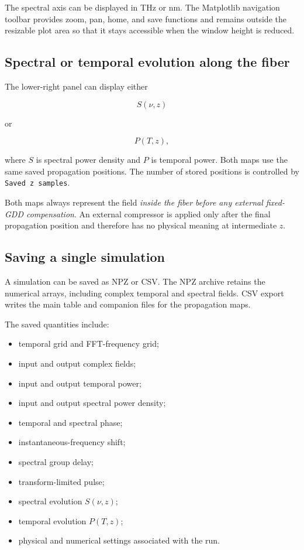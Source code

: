 \documentclass[11pt,a4paper]{article}
\begin{document}
The spectral axis can be displayed in THz or nm. The Matplotlib navigation
toolbar provides zoom, pan, home, and save functions and remains outside the
resizable plot area so that it stays accessible when the window height is
reduced.

\subsection{Spectral or temporal evolution along the fiber}

The lower-right panel can display either

\begin{equation}
S(\nu,z)
\end{equation}

or

\begin{equation}
P(T,z),
\end{equation}

where $S$ is spectral power density and $P$ is temporal power. Both maps use the
same saved propagation positions. The number of stored positions is controlled
by \texttt{Saved z samples}.

Both maps always represent the field \emph{inside the fiber before any external
fixed-GDD compensation}. An external compressor is applied only after the final
propagation position and therefore has no physical meaning at intermediate $z$.

\subsection{Saving a single simulation}

A simulation can be saved as NPZ or CSV. The NPZ archive retains the numerical
arrays, including complex temporal and spectral fields. CSV export writes the
main table and companion files for the propagation maps.

The saved quantities include:

\begin{itemize}
    \item temporal grid and FFT-frequency grid;
    \item input and output complex fields;
    \item input and output temporal power;
    \item input and output spectral power density;
    \item temporal and spectral phase;
    \item instantaneous-frequency shift;
    \item spectral group delay;
    \item transform-limited pulse;
    \item spectral evolution $S(\nu,z)$;
    \item temporal evolution $P(T,z)$;
    \item physical and numerical settings associated with the run.
\end{itemize}
\end{document}
